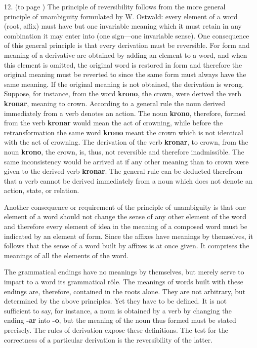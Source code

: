 12. (to page \pageref{reversibility}) The principle of reversibility follows from the more general principle of unambiguity formulated by W. Ostwald: every element of a word (root, affix) must have but one invariable meaning which it must retain in any combination it may enter into (one sign—one invariable sense). One consequence of this general principle is that every derivation must be reversible. For form and meaning of a derivative are obtained by adding an element to a word, and when this element is omitted, the original word is restored in form and therefore the original meaning must be reverted to since the same form must always have the same meaning. If the original meaning is not obtained, the derivation is wrong. Suppose, for instance, from the word \textbf{krono}, the crown, were derived the verb \textbf{kronar}, meaning to crown. According to a general rule the noun derived immediately from a verb denotes an action. The noun \textbf{krono}, therefore, formed from the verb \textbf{kronar} would mean the act of crowning, while before the retransformation the same word \textbf{krono} meant the crown which is not identical with the act of crowning. The derivation of the verb \textbf{kronar}, to crown, from the noun \textbf{krono}, the crown, is, thus, not reversible and therefore inadmissible. The same inconsistency would be arrived at if any other meaning than to crown were given to the derived verb \textbf{kronar}. The general rule can be deducted therefrom that a verb cannot be derived immediately from a noun which does not denote an action, state, or relation.

Another consequence or requirement of the principle of unambiguity is that one element of a word should not change the sense of any other element of the word and therefore every element of idea in the meaning of a composed word must be indicated by an element of form. Since the affixes have meanings by themselves, it follows that the sense of a word built by affixes is at once given. It comprises the meanings of all the elements of the word.

The grammatical endings have no meanings by themselves, but merely serve to impart to a word its grammatical rôle. The meanings of words built with these endings are, therefore, contained in the roots alone. They are not arbitrary, but determined by the above principles. Yet they have to be defined. It is not sufficient to say, for instance, a noun is obtained by a verb by changing the ending \textbf{-ar} into \textbf{-o}, but the meaning of the noun thus formed must be stated precisely. The rules of derivation expose these definitions. The test for the correctness of a particular derivation is the reversibility of the latter.


